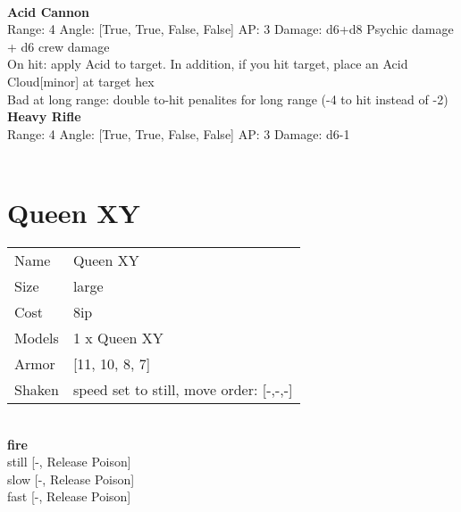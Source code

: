 \ \\
{\bf Acid Cannon } \\



Range: 4  Angle: [True, True, False, False] AP: 3 Damage: d6+d8 Psychic damage + d6 crew damage \\
On hit: apply Acid to target. In addition, if you hit target, place an Acid Cloud[minor] at target hex\\ 
Bad at long range: double to-hit penalites for long range (-4 to hit instead of -2)\\ 




{\bf Heavy Rifle } \\



Range: 4  Angle: [True, True, False, False] AP: 3 Damage: d6-1 \\




 
\ \\













\clearpage

\section{ Queen XY }

\begin{tabular}{ll}
  Name & Queen XY \\
  Size & large\\
  Cost & 8ip\\
  Models & 1 x Queen XY\\
  Armor & [11, 10, 8, 7]\\
  Shaken & speed set to still, move order: [-,-,-]\\
\end{tabular}

\noindent 

\ \\ {\bf fire } \\
still [-, Release Poison] \\
slow [-, Release Poison] \\
fast [-, Release Poison] \\


